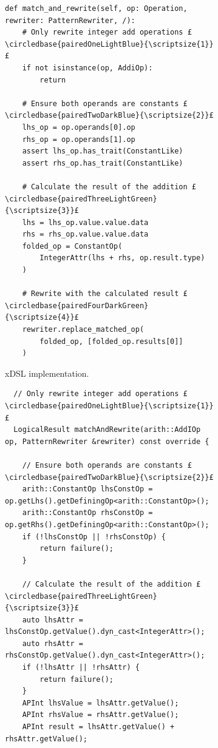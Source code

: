 \begin{figure}[H]
    \centering
    \begin{subfigure}[b]{0.45\textwidth}
       \centering
        \begin{verbatim}
def match_and_rewrite(self, op: Operation, rewriter: PatternRewriter, /):
    # Only rewrite integer add operations £\circledbase{pairedOneLightBlue}{\scriptsize{1}}£
    if not isinstance(op, AddiOp):
        return

    # Ensure both operands are constants £\circledbase{pairedTwoDarkBlue}{\scriptsize{2}}£
    lhs_op = op.operands[0].op
    rhs_op = op.operands[1].op
    assert lhs_op.has_trait(ConstantLike)
    assert rhs_op.has_trait(ConstantLike)

    # Calculate the result of the addition £\circledbase{pairedThreeLightGreen}{\scriptsize{3}}£
    lhs = lhs_op.value.value.data
    rhs = rhs_op.value.value.data
    folded_op = ConstantOp(
        IntegerAttr(lhs + rhs, op.result.type)
    )

    # Rewrite with the calculated result £\circledbase{pairedFourDarkGreen}{\scriptsize{4}}£
    rewriter.replace_matched_op(
        folded_op, [folded_op.results[0]]
    )
        \end{verbatim}
        \footnotesize\vspace{5em}
        \captionsetup{name=Listing}
        \caption{xDSL implementation.}
        \label{listing:constant-folding-impl-xdsl}
    \end{subfigure}
    \hfill
    \begin{subfigure}[b]{0.5\textwidth}
        \centering
        \begin{verbatim}
  // Only rewrite integer add operations £\circledbase{pairedOneLightBlue}{\scriptsize{1}}£
  LogicalResult matchAndRewrite(arith::AddIOp op, PatternRewriter &rewriter) const override {

    // Ensure both operands are constants £\circledbase{pairedTwoDarkBlue}{\scriptsize{2}}£
    arith::ConstantOp lhsConstOp = op.getLhs().getDefiningOp<arith::ConstantOp>();
    arith::ConstantOp rhsConstOp = op.getRhs().getDefiningOp<arith::ConstantOp>();
    if (!lhsConstOp || !rhsConstOp) {
        return failure();
    }

    // Calculate the result of the addition £\circledbase{pairedThreeLightGreen}{\scriptsize{3}}£
    auto lhsAttr = lhsConstOp.getValue().dyn_cast<IntegerAttr>();
    auto rhsAttr = rhsConstOp.getValue().dyn_cast<IntegerAttr>();
    if (!lhsAttr || !rhsAttr) {
        return failure();
    }
    APInt lhsValue = lhsAttr.getValue();
    APInt rhsValue = rhsAttr.getValue();
    APInt result = lhsAttr.getValue() + rhsAttr.getValue();


\end{verbatim}
\end{subfigure}
\end{figure}
